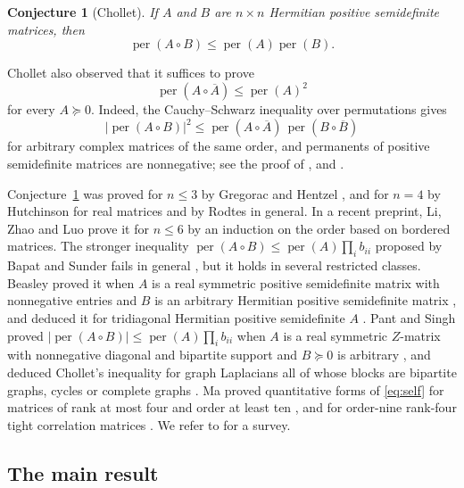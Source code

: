 \documentclass[11pt]{amsart}
\newtheorem{conjecture}[theorem]{Conjecture}
\theoremstyle{remark}
\numberwithin{equation}{section}
\newcommand{\per}{\operatorname{per}}
\newcommand{\conj}[1]{\overline{#1}}
\begin{document}
\begin{conjecture}[Chollet]\label{conj:chollet}
If $A$ and $B$ are $n\times n$ Hermitian positive semidefinite matrices, then
\begin{equation}\label{eq:chollet}
\per(A\circ B)\le\per(A)\per(B).
\end{equation}
\end{conjecture}

Chollet also observed that it suffices to prove
\begin{equation}\label{eq:self}
\per(A\circ\conj{A})\le\per(A)^2
\end{equation}
for every $A\succeq0$. Indeed, the Cauchy--Schwarz inequality over permutations gives
\begin{equation}\label{eq:cs}
|\per(A\circ B)|^2\le\per(A\circ\conj{A})\,\per(B\circ\conj{B})
\end{equation}
for arbitrary complex matrices of the same order, and permanents of positive semidefinite matrices are nonnegative; see the proof of \cite[Lemma~2.2]{Bea}, \cite[Lemma~2]{PS} and \cite[Lemma~2.1]{Ma}.

Conjecture~\ref{conj:chollet} was proved for $n\le3$ by Gregorac and Hentzel \cite{GH}, and for $n=4$ by Hutchinson \cite{Hut} for real matrices and by Rodtes \cite{Rod} in general. In a recent preprint, Li, Zhao and Luo \cite{LZL} prove it for $n\le6$ by an induction on the order based on bordered matrices. The stronger inequality $\per(A\circ B)\le\per(A)\prod_ib_{ii}$ proposed by Bapat and Sunder \cite{BS} fails in general \cite{Dru}, but it holds in several restricted classes. Beasley proved it when $A$ is a real symmetric positive semidefinite matrix with nonnegative entries and $B$ is an arbitrary Hermitian positive semidefinite matrix \cite[Theorem~3.2]{Bea}, and deduced it for tridiagonal Hermitian positive semidefinite $A$ \cite[Corollary~3.2.3]{Bea}. Pant and Singh \cite{PS} proved $|\per(A\circ B)|\le\per(A)\prod_i b_{ii}$ when $A$ is a real symmetric $Z$-matrix with nonnegative diagonal and bipartite support and $B\succeq0$ is arbitrary \cite[Theorem~1]{PS}, and deduced Chollet's inequality for graph Laplacians all of whose blocks are bipartite graphs, cycles or complete graphs \cite[Corollary~6]{PS}. Ma \cite{Ma} proved quantitative forms of \eqref{eq:self} for matrices of rank at most four and order at least ten \cite[Theorem~1.2]{Ma}, and for order-nine rank-four tight correlation matrices \cite[Theorem~1.3]{Ma}. We refer to \cite{Zha} for a survey.

\subsection{The main result}
\end{document}
